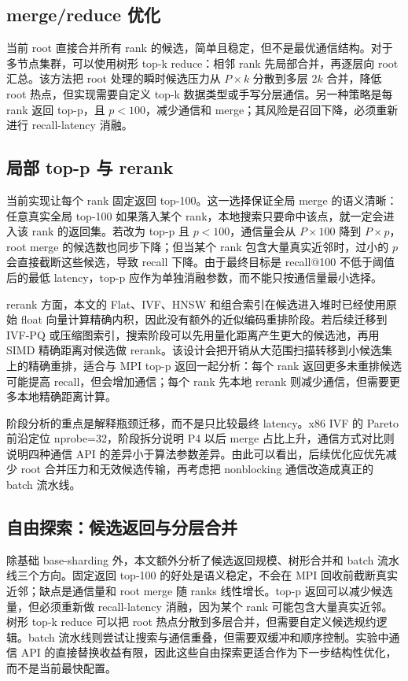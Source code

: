 \documentclass[11pt,a4paper]{article}
\begin{document}
\subsection{merge/reduce 优化}

当前 root 直接合并所有 rank 的候选，简单且稳定，但不是最优通信结构。对于多节点集群，可以使用树形 top-k reduce：相邻 rank 先局部合并，再逐层向 root 汇总。该方法把 root 处理的瞬时候选压力从 $P\times k$ 分散到多层 $2k$ 合并，降低 root 热点，但实现需要自定义 top-k 数据类型或手写分层通信。另一种策略是每 rank 返回 top-p，且 $p<100$，减少通信和 merge；其风险是召回下降，必须重新进行 recall-latency 消融。

\subsection{局部 top-p 与 rerank}

当前实现让每个 rank 固定返回 top-100。这一选择保证全局 merge 的语义清晰：任意真实全局 top-100 如果落入某个 rank，本地搜索只要命中该点，就一定会进入该 rank 的返回集。若改为 top-p 且 $p<100$，通信量会从 $P\times100$ 降到 $P\times p$，root merge 的候选数也同步下降；但当某个 rank 包含大量真实近邻时，过小的 $p$ 会直接截断这些候选，导致 recall 下降。由于最终目标是 recall@100 不低于阈值后的最低 latency，top-p 应作为单独消融参数，而不能只按通信量最小选择。

rerank 方面，本文的 Flat、IVF、HNSW 和组合索引在候选进入堆时已经使用原始 float 向量计算精确内积，因此没有额外的近似编码重排阶段。若后续迁移到 IVF-PQ 或压缩图索引，搜索阶段可以先用量化距离产生更大的候选池，再用 SIMD 精确距离对候选做 rerank。该设计会把开销从大范围扫描转移到小候选集上的精确重排，适合与 MPI top-p 返回一起分析：每个 rank 返回更多未重排候选可能提高 recall，但会增加通信；每个 rank 先本地 rerank 则减少通信，但需要更多本地精确距离计算。

阶段分析的重点是解释瓶颈迁移，而不是只比较最终 latency。x86 IVF 的 Pareto 前沿定位 nprobe=32，阶段拆分说明 P4 以后 merge 占比上升，通信方式对比则说明四种通信 API 的差异小于算法参数差异。由此可以看出，后续优化应优先减少 root 合并压力和无效候选传输，再考虑把 nonblocking 通信改造成真正的 batch 流水线。

\subsection{自由探索：候选返回与分层合并}

除基础 base-sharding 外，本文额外分析了候选返回规模、树形合并和 batch 流水线三个方向。固定返回 top-100 的好处是语义稳定，不会在 MPI 回收前截断真实近邻；缺点是通信量和 root merge 随 ranks 线性增长。top-p 返回可以减少候选量，但必须重新做 recall-latency 消融，因为某个 rank 可能包含大量真实近邻。树形 top-k reduce 可以把 root 热点分散到多层合并，但需要自定义候选规约逻辑。batch 流水线则尝试让搜索与通信重叠，但需要双缓冲和顺序控制。实验中通信 API 的直接替换收益有限，因此这些自由探索更适合作为下一步结构性优化，而不是当前最快配置。
\end{document}
